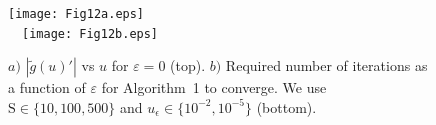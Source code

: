 \documentclass[10pt,journal,a4paper]{IEEEtran}
\begin{document}
	\begin{figure}[t!]
		\texttt{[image: Fig12a.eps]}\vspace{4mm}\\		
		\vspace{0mm}\ \  \texttt{[image: Fig12b.eps]}
		\caption{$a)$ $|\tilde{g}(u)'|$ vs $u$ for $\varepsilon=0$ (top). $b)$ Required number of iterations as a function of $\varepsilon$ for Algorithm~1 to converge. We use $\mathrm{S\in\{10,100,500\}}$ and $u_\epsilon\in\{10^{-2},10^{-5}\}$ (bottom).}
		\label{Fig12}
	\end{figure}
	
	
	
	
\end{document}
